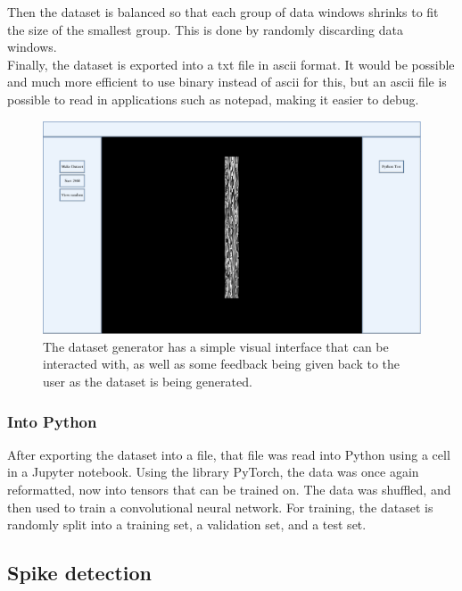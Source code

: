Then the dataset is balanced so that each group of data windows shrinks to fit the size of the smallest group. This is done by randomly discarding data windows. \\

Finally, the dataset is exported into a txt file in ascii format. It would be possible and much more efficient to use binary instead of ascii for this, but an ascii file is possible to read in applications such as notepad, making it easier to debug. \\

\begin{figure}[H]
    \centering
    \includegraphics[width=1\textwidth]{images/datasetgenerator.PNG}
    \caption{The dataset generator has a simple visual interface that can be interacted with, as well as some feedback being given back to the user as the dataset is being generated.}
    \label{dataset_generator}
\end{figure}

\subsubsection{Into Python}

After exporting the dataset into a file, that file was read into Python using a cell in a Jupyter notebook. Using the library PyTorch, the data was once again reformatted, now into tensors that can be trained on. The data was shuffled, and then used to train a convolutional neural network. For training, the dataset is randomly split into a training set, a validation set, and a test set.

\subsection{Spike detection}
